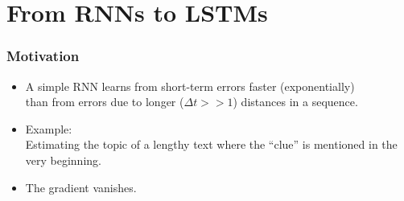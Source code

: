 \section{From RNNs to LSTMs}



\begin{frame}\frametitle{Motivation}
	\begin{itemize}
	\setlength\itemsep{1cm}
	\item[]
	A simple RNN learns from short-term errors faster (exponentially)\\
	than from errors due to longer ($\Delta t >\!\!> 1$) distances in a sequence.\\
	
	\item[]Example:\\Estimating the topic of a lengthy text where the ``clue'' is mentioned in the very beginning.\\
	
	\item[]The gradient vanishes.
	\end{itemize}
\end{frame}

